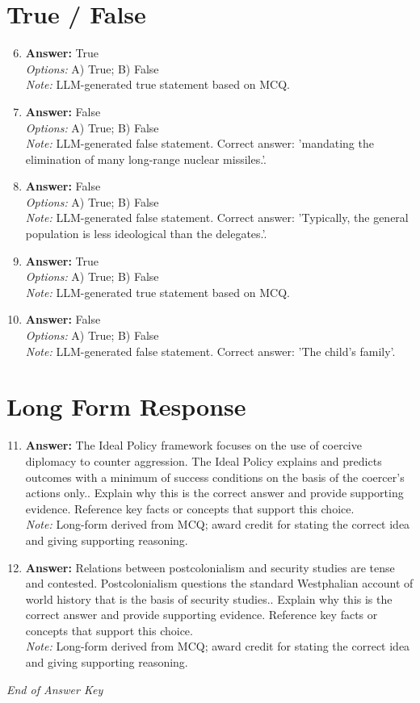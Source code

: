 \documentclass[12pt]{article}
\begin{document}
\section*{True / False}
\begin{enumerate}[label=\arabic*.]
\setcounter{enumi}{5}
\item \textbf{Answer:} True
\\ \textit{Options:} A) True; B) False
\\ \textit{Note:} LLM-generated true statement based on MCQ.
\item \textbf{Answer:} False
\\ \textit{Options:} A) True; B) False
\\ \textit{Note:} LLM-generated false statement. Correct answer: 'mandating the elimination of many long-range nuclear missiles.'.
\item \textbf{Answer:} False
\\ \textit{Options:} A) True; B) False
\\ \textit{Note:} LLM-generated false statement. Correct answer: 'Typically, the general population is less ideological than the delegates.'.
\item \textbf{Answer:} True
\\ \textit{Options:} A) True; B) False
\\ \textit{Note:} LLM-generated true statement based on MCQ.
\item \textbf{Answer:} False
\\ \textit{Options:} A) True; B) False
\\ \textit{Note:} LLM-generated false statement. Correct answer: 'The child's family'.
\end{enumerate}

\section*{Long Form Response}
\begin{enumerate}[label=\arabic*.]
\setcounter{enumi}{10}
\item \textbf{Answer:} The Ideal Policy framework focuses on the use of coercive diplomacy to counter aggression. The Ideal Policy explains and predicts outcomes with a minimum of success conditions on the basis of the coercer's actions only.. Explain why this is the correct answer and provide supporting evidence. Reference key facts or concepts that support this choice.
\\ \textit{Note:} Long-form derived from MCQ; award credit for stating the correct idea and giving supporting reasoning.
\item \textbf{Answer:} Relations between postcolonialism and security studies are tense and contested. Postcolonialism questions the standard Westphalian account of world history that is the basis of security studies.. Explain why this is the correct answer and provide supporting evidence. Reference key facts or concepts that support this choice.
\\ \textit{Note:} Long-form derived from MCQ; award credit for stating the correct idea and giving supporting reasoning.
\end{enumerate}

\vfill
\noindent\textit{End of Answer Key}
\end{document}

